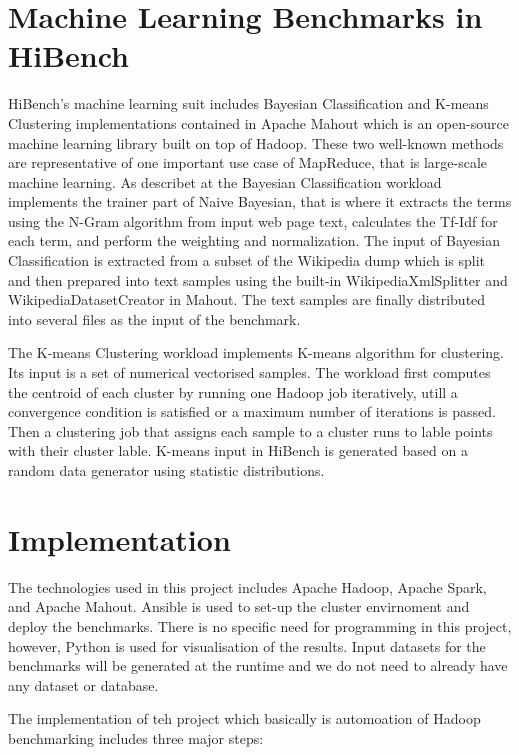 \documentclass[12pt, letterpaper]{article}
\begin{document}
\section{Machine Learning Benchmarks in HiBench}
HiBench's machine learning suit includes Bayesian Classification and K-means Clustering implementations contained in Apache Mahout which is an open-source  machine learning library built on top of Hadoop. These two well-known methods are representative of one important use case of MapReduce, that is large-scale machine learning.
As describet at \cite{hibench2} the Bayesian Classification workload implements the
trainer part of Naive Bayesian, that is where it extracts the terms
using the N-Gram algorithm from input web page text,
calculates the Tf-Idf for each term, and perform the weighting and
normalization. The input of Bayesian Classification is extracted from a
subset of the Wikipedia dump which is split and then prepared into text samples using the built-in
WikipediaXmlSplitter and WikipediaDatasetCreator in Mahout. The text samples are finally distributed into several files as the input of the benchmark.

The K-means Clustering workload implements K-means algorithm for clustering. 
Its input is a set of numerical vectorised samples. The workload first computes the centroid of each
cluster by running one Hadoop job iteratively, utill a convergence condition is satisfied or a maximum number of iterations is passed. Then a clustering job that
assigns each sample to a cluster runs to lable points with their cluster lable. K-means input in HiBench is generated based on a random data generator using statistic distributions.



\section{Implementation}

The technologies used in this project includes Apache Hadoop, Apache Spark, and Apache Mahout. Ansible is used to set-up the cluster envirnoment and deploy the benchmarks. There is no specific need for programming in this project, however, Python is used for visualisation of the results. Input datasets for the benchmarks will be generated at the runtime and we do not need to already have any dataset or database.


The implementation of teh project which basically is automoation of Hadoop benchmarking includes three major steps: 
\end{document}
